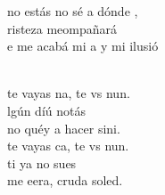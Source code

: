 \begin{cancion}
	no estás no sé a dónde ,\\
	risteza meompañará\\
	e me acabá mi a y mi ilusió\\\jump\\
	\begin{chorus}%
	 te vayas na, te vs nun.\\
	lgún díú notás\\
	no  quéy a hacer sini. \\
	 te vayas ca, te vs nun.\\
	ti ya no  sues\\
	me eera, cruda soled.\\
	\end{chorus}%
	\jump\\
\end{cancion}%
